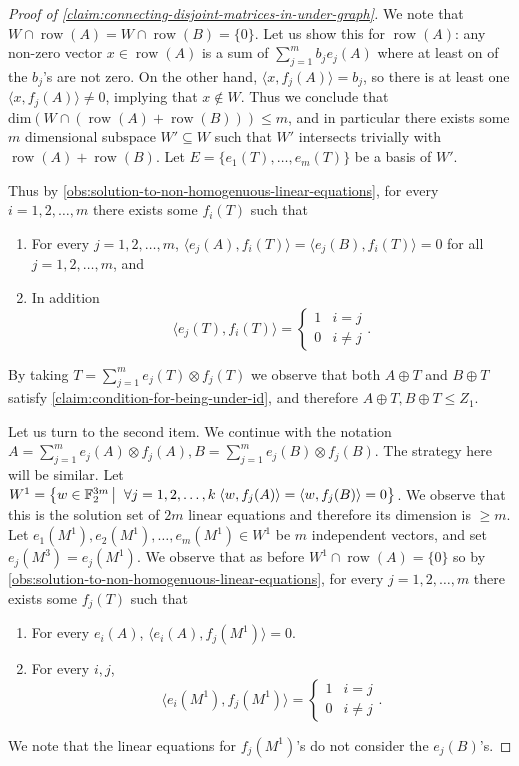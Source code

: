 \documentclass[10pt,a4paper]{article}
\newcommand{\prettyref}[1]{\cref{#1}}
\theoremstyle{definition}
\theoremstyle{remark}
\newcommand\sett[2]{\left\{ #1 \left| \; \vphantom{#1 #2} \right. #2  \right\}}
\newcommand{\set}[1]{\{#1\}}
\newcommand{\iprod}[1]{\langle#1\rangle}
\def\dim{\mathrm{ dim}}
\newcommand{\F}{\mathbb{F}}
\DeclareMathOperator{\row}{row}
\renewcommand{\leq}{\leqslant}
\renewcommand{\geq}{\geqslant}
\numberwithin{equation}{section}
\let\pref=\prettyref
\begin{document}
\begin{proof}[Proof of \pref{claim:connecting-disjoint-matrices-in-under-graph}]
    We note that \(W \cap \row(A)=W \cap \row(B) = \set{0}\). Let us show this for \(\row(A)\): any non-zero vector \(x\in \row(A)\) is a sum of \(\sum_{j=1}^{m} b_j e_j(A)\) where at least on of the \(b_j\)'s are not zero. On the other hand, \(\iprod{x,f_j(A)} = b_j\), so there is at least one \(\iprod{x,f_j(A)} \ne 0\), implying that \(x \notin W\). Thus we conclude that \(\dim(W \cap (\row(A) + \row(B))) \leq m\), and in particular there exists some \(m\) dimensional subspace \(W' \subseteq W\) such that \(W'\) intersects trivially with \(\row(A) + \row(B)\). Let \(E = \set{e_1(T),\dots,e_{m}(T)}\) be a basis of \(W'\).

    Thus by \pref{obs:solution-to-non-homogenuous-linear-equations}, for every \(i=1,2,\dots,m\) there exists some \(f_i(T)\) such that 
    \begin{enumerate}
        \item For every \(j=1,2,\dots,m\), \(\iprod{e_j(A),f_i(T)} = \iprod{e_j(B),f_i(T)} = 0\) for all \(j=1,2,\dots,m\), and
        \item In addition
        \[\iprod{e_j(T),f_i(T)} = \begin{cases}
        1 & i=j \\ 0 & i \ne j
    \end{cases}.\]
    \end{enumerate} 
    By taking \(T = \sum_{j=1}^{m} e_j(T) \otimes f_j(T)\) we observe that both \(A \oplus T\) and \(B \oplus T\) satisfy \pref{claim:condition-for-being-under-id}, and therefore \(A \oplus T, B \oplus T \leq Z_1\).
    
    \medskip
    
    Let us turn to the second item. We continue with the notation \(A = \sum_{j=1}^{m} e_j(A) \otimes f_j(A), B=\sum_{j=1}^{m}e_j(B) \otimes f_j(B)\). The strategy here will be similar. Let \(W^1 = \sett{w \in \F_2^{3m}}{\forall j=1,2,\dots,k \; \iprod{w,f_j(A)}=\iprod{w,f_j(B)}=0}\). We observe that this is the solution set of \(2m\) linear equations and therefore its dimension is \(\geq m\). Let \(e_1(M^{1}),e_2(M^{1}),\dots,e_{m}(M^{1}) \in W^1\) be \(m\) independent vectors, and set \(e_j(M^3)=e_j(M^1)\). We observe that as before \(W^1 \cap \row(A) = \set{0}\) so by \pref{obs:solution-to-non-homogenuous-linear-equations}, for every \(j=1,2,\dots,m\) there exists some \(f_j(T)\) such that
    \begin{enumerate}
        \item For every \(e_i(A)\), \(\iprod{e_i(A),f_j(M^1)}=0\).
        \item For every \(i,j\), \[\iprod{e_i(M^1),f_j(M^1)} = \begin{cases}
        1 & i=j \\ 0 & i \ne j
    \end{cases}.\]
    \end{enumerate}
    We note that the linear equations for \(f_j(M^1)\)'s do not consider the \(e_j(B)\)'s. 
    

\end{proof}
\end{document}
